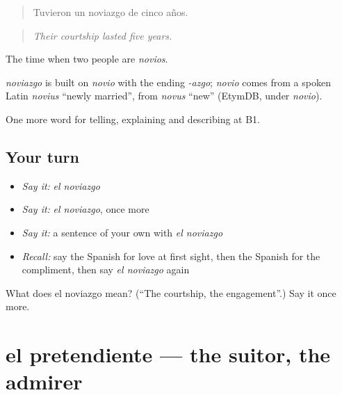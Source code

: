 \begin{quote}
Tuvieron un noviazgo de cinco años.
\end{quote}

\begin{quote}
\emph{Their courtship lasted five years.}
\end{quote}

The time when two people are \emph{novios}.

\begin{cousinweb}
\emph{noviazgo} is built on \emph{novio} with the ending \emph{-azgo}; \emph{novio} comes from a spoken Latin \emph{novius} \textquotedblleft{}newly married\textquotedblright{}, from \emph{novus} \textquotedblleft{}new\textquotedblright{} (EtymDB, under \emph{novio}).
\end{cousinweb}

\begin{grammarlens}[title={What you've built}]
One more word for telling, explaining and describing at B1.
\end{grammarlens}

\subsection*{Your turn}
\begin{itemize}
\raggedright
  \item \emph{Say it:} \emph{el noviazgo}
  \item \emph{Say it:} \emph{el noviazgo}, once more
  \item \emph{Say it:} a sentence of your own with \emph{el noviazgo}
  \item \emph{Recall:} say the Spanish for love at first sight, then the Spanish for the compliment, then say \emph{el noviazgo} again
\end{itemize}

\begin{tcolorbox}[breakable,colback=teal!4,colframe=teal!35!black,title={Before you move on}]
What does el noviazgo mean? (\textquotedblleft{}The courtship, the engagement\textquotedblright{}.) Say it once more.
\end{tcolorbox}
\section[el pretendiente]{el pretendiente — the suitor, the admirer}

\label{lesson:ES-C744-pretendiente}



